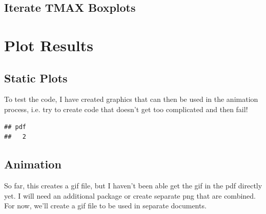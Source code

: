 \documentclass{article}\usepackage[]{graphicx}\usepackage[]{color}
\makeatletter
\newenvironment{kframe}{%
 \def\at@end@of@kframe{}%
 \ifinner\ifhmode%
  \def\at@end@of@kframe{\end{minipage}}%
  \begin{minipage}{\columnwidth}%
 \fi\fi%
 \def\FrameCommand##1{\hskip\@totalleftmargin \hskip-\fboxsep
 \colorbox{shadecolor}{##1}\hskip-\fboxsep
     \hskip-\linewidth \hskip-\@totalleftmargin \hskip\columnwidth}%
 \MakeFramed {\advance\hsize-\width
   \@totalleftmargin\z@ \linewidth\hsize
   \@setminipage}}%
 {\par\unskip\endMakeFramed%
 \at@end@of@kframe}
\newenvironment{knitrout}{}{} %
\makeatother
\begin{document}
\subsection{Iterate TMAX Boxplots}



\section{Plot Results}

\subsection{Static Plots}

To test the code, I have created graphics that can then be used in the animation process, i.e. try to create code that doesn't get too complicated and then fail! 

\begin{knitrout}
\color{fgcolor}\begin{kframe}
\begin{verbatim}
## pdf 
##   2
\end{verbatim}
\end{kframe}
\end{knitrout}

\subsection{Animation}

So far, this creates a gif file, but I haven't been able get the gif in the pdf directly yet. I will need an additional package or create separate png that are combined. For now, we'll create a gif file to be used in separate documents. 
\end{document}
